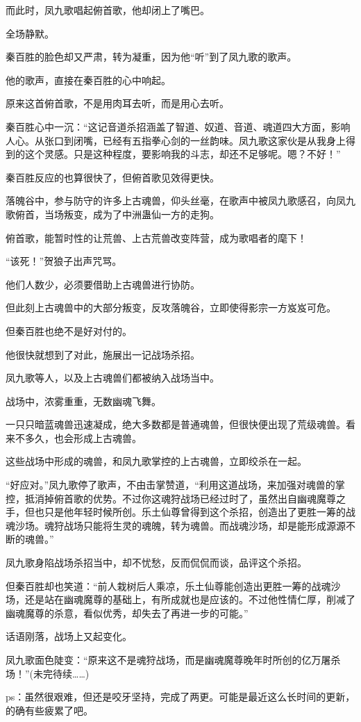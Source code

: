 \begin{this_body}
而此时，凤九歌唱起俯首歌，他却闭上了嘴巴。

全场静默。

秦百胜的脸色却又严肃，转为凝重，因为他“听”到了凤九歌的歌声。

他的歌声，直接在秦百胜的心中响起。

原来这首俯首歌，不是用肉耳去听，而是用心去听。

秦百胜心中一沉：“这记音道杀招涵盖了智道、奴道、音道、魂道四大方面，影响人心。从张口到闭嘴，已经有五指拳心剑的一丝韵味。凤九歌这家伙是从我身上得到的这个灵感。只是这种程度，要影响我的斗志，却还不足够呢。嗯？不好！”

秦百胜反应的也算很快了，但俯首歌见效得更快。

落魄谷中，参与防守的许多上古魂兽，仰头丝毫，在歌声中被凤九歌感召，向凤九歌俯首，当场叛变，成为了中洲蛊仙一方的走狗。

俯首歌，能暂时性的让荒兽、上古荒兽改变阵营，成为歌唱者的麾下！

“该死！”贺狼子出声咒骂。

他们人数少，必须要借助上古魂兽进行协防。

但此刻上古魂兽中的大部分叛变，反攻落魄谷，立即使得影宗一方岌岌可危。

但秦百胜也绝不是好对付的。

他很快就想到了对此，施展出一记战场杀招。

凤九歌等人，以及上古魂兽们都被纳入战场当中。

战场中，浓雾重重，无数幽魂飞舞。

一只只暗蓝魂兽迅速凝成，绝大多数都是普通魂兽，但很快便出现了荒级魂兽。看来不多久，也会形成上古魂兽。

这些战场中形成的魂兽，和凤九歌掌控的上古魂兽，立即绞杀在一起。

“好应对。”凤九歌停了歌声，不由击掌赞道，“利用这道战场，来加强对魂兽的掌控，抵消掉俯首歌的优势。不过你这魂狩战场已经过时了，虽然出自幽魂魔尊之手，但也只是他年轻时候所创。乐土仙尊曾得到这个杀招，创造出了更胜一筹的战魂沙场。魂狩战场只能将生灵的魂魄，转为魂兽。而战魂沙场，却是能形成源源不断的魂兽。”

凤九歌身陷战场杀招当中，却不忧愁，反而侃侃而谈，品评这个杀招。

但秦百胜却也笑道：“前人栽树后人乘凉，乐土仙尊能创造出更胜一筹的战魂沙场，还是站在幽魂魔尊的基础上，有所成就也是应该的。不过他性情仁厚，削减了幽魂魔尊的杀意，看似优秀，却失去了再进一步的可能。”

话语刚落，战场上又起变化。

凤九歌面色陡变：“原来这不是魂狩战场，而是幽魂魔尊晚年时所创的亿万屠杀场！”(未完待续……)

ps：虽然很艰难，但还是咬牙坚持，完成了两更。可能是最近这么长时间的更新，的确有些疲累了吧。

\end{this_body}

